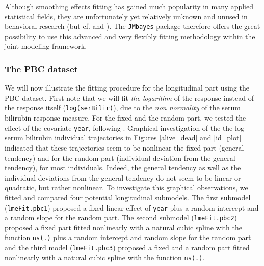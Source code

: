 \documentclass[12pt]{article}
\begin{document}
Although smoothing effects fitting has gained much popularity in many applied statistical fields, they are unfortunately yet relatively unknown and unused in behavioral research (but cf. \cite{Shadish2013} and \cite{Ghisletta_2018}). The \texttt{JMbayes} package therefore offers the great possibility to use this advanced and very flexibly fitting methodology within the joint modeling framework. 


\subsubsection{The PBC dataset}
\label{long_pbc}
We will now illustrate the fitting procedure for the longitudinal part using the PBC dataset. First note that we will fit \textit{the logarithm} of the response instead of the response itself (\texttt{log(serBilir)}), due to the \textit{non normality} of the serum bilirubin response measure. For the fixed and the random part, we tested the effect of the covariate \texttt{year}, following \cite{JMbayes}. Graphical investigation of the the log serum bilirubin individual trajectories in Figures \ref{alive_dead} and \ref{id_plot} indicated that these trajectories seem to be nonlinear the fixed part (general tendency) and for the random part (individual deviation from the general tendency), for most individuals. Indeed, the general tendency as well as the individual deviations from the general tendency do not seem to be linear or quadratic, but rather nonlinear. To investigate this graphical observations, we fitted and compared four potential longitudinal submodels. The first submodel (\texttt{lmeFit.pbc1}) proposed a fixed linear effect of \texttt{year} plus a random intercept and a random slope for the random part. The second submodel (\texttt{lmeFit.pbc2}) proposed a fixed part fitted nonlinearly with a natural cubic spline with the function \texttt{ns(.)} plus a random intercept and random slope for the random part and the third model (\texttt{lmeFit.pbc3}) proposed a fixed and a random part fitted nonlinearly with a natural cubic spline with the function \texttt{ns(.)}. 
\end{document}
